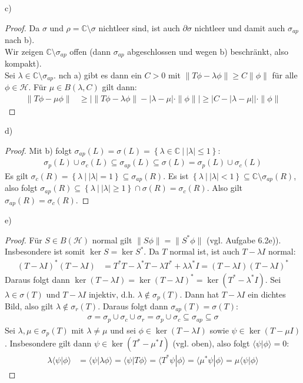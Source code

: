 \documentclass[a4paper,12pt]{article}
\newcommand{\brak}{}
\newcommand{\klammer}{}
\begin{document}
c)
\begin{proof}
Da $\sigma$ und $\rho=\mathbb{C}\setminus\sigma$ nichtleer sind, ist auch $\partial\sigma$ nichtleer und damit auch $\sigma_{ap}$ nach b).\\
Wir zeigen $\mathbb{C}\setminus\sigma_{ap}$ offen (dann $\sigma_{ap}$ abgeschlossen und wegen b) beschränkt, also kompakt). \\
Sei $\lambda\in\mathbb{C}\setminus\sigma_{ap}$. nch a) gibt es dann ein $C>0$ mit $\|T\phi-\lambda\phi\|\ge C\|\phi\|$ für alle $\phi\in\mathcal{H}$. Für $\mu\in B(\lambda, C)$ gilt dann:
\begin{align*}
\|T\phi-\mu\phi\|&\ge |\|T\phi-\lambda\phi\|-|\lambda-\mu|\cdot\|\phi\||\ge |C-|\lambda-\mu||\cdot\|\phi\|
\end{align*}
\end{proof}
d)
\begin{proof}
Mit b) folgt $\sigma_{ap}(L)=\sigma(L)=\klammer\left\{ {\lambda\in\mathbb{C}\ \vert\ |\lambda|\le 1} \right\}$:
\begin{align*}
\sigma_p(L)\cup\sigma_c(L)\subseteq\sigma_{ap}(L)\subseteq\sigma(L)=\sigma_p(L)\cup\sigma_c(L)
\end{align*}
Es gilt $\sigma_c(R)=\klammer\left\{ {\lambda\ \vert\ |\lambda|=1} \right\}\subseteq\sigma_{ap}(R)$. Es ist $\klammer\left\{ {\lambda\ \vert\ |\lambda|<1} \right\}\subseteq\mathbb{C}\setminus\sigma_{ap}(R)$, also folgt $\sigma_{ap}(R)\subseteq\klammer\left\{ {\lambda\ \vert\ |\lambda|\ge 1} \right\}\cap\sigma(R)=\sigma_c(R)$. Also gilt $\sigma_{ap}(R)=\sigma_c(R)$.
\end{proof}
e)
\begin{proof}
Für $S\in B(\mathcal{H})$ normal gilt $\|S\phi\|=\|S^\ast\phi\|$ (vgl. Aufgabe 6.2e)). Insbesondere ist somit $\ker S=\ker S^\ast$. Da $T$ normal ist, ist auch $T-\lambda I$ normal:
\begin{align*}
(T-\lambda I)^\ast(T-\lambda I)&=T^\ast T-\lambda^\ast T-\lambda T^\ast +\lambda\lambda^\ast I=(T-\lambda I)(T-\lambda I)^\ast
\end{align*}
Daraus folgt dann $\ker(T-\lambda I)=\ker(T-\lambda I)^\ast=\ker(T^\ast-\lambda^\ast I)$.
Sei $\lambda\in\sigma(T)$ und $T-\lambda I$ injektiv, d.h. $\lambda\notin\sigma_p(T)$. Dann hat $T-\lambda I$ ein dichtes Bild, also gilt $\lambda\notin\sigma_r(T)$. Daraus folgt dann $\sigma_{ap}(T)=\sigma(T)$:
\begin{align*}
\sigma=\sigma_p\cup\sigma_c\cup\sigma_r=\sigma_p\cup\sigma_c\subseteq\sigma_{ap}\subseteq\sigma
\end{align*}
Sei $\lambda,\mu\in\sigma_p(T)$ mit $\lambda\neq\mu$ und sei $\phi\in\ker(T-\lambda I)$ sowie $\psi\in\ker(T-\mu I)$. Insbesondere gilt dann $\psi\in\ker(T^\ast-\mu^\ast I)$ (vgl. oben), also folgt $\brak\langle {\psi}| {\phi}\rangle=0$:
\begin{align*}
\lambda\brak\langle {\psi}| {\phi}\rangle&=\brak\langle {\psi}| {\lambda\phi}\rangle=\brak\langle {\psi}| {T\phi}\rangle=\brak\langle {T^\ast\psi}| {\phi}\rangle=\brak\langle {\mu^\ast\psi}| {\phi}\rangle=\mu\brak\langle {\psi}| {\phi}\rangle
\end{align*}
\end{proof}
\end{document}
